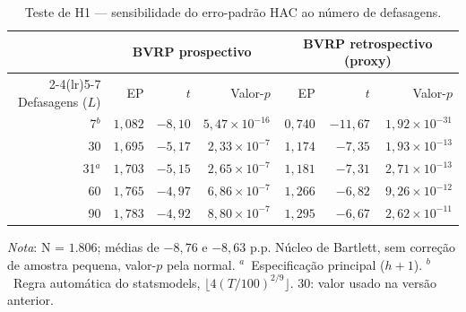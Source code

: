 \begin{table}[H]
\centering
\small
\caption{Teste de H1 --- sensibilidade do erro-padrão HAC ao número de defasagens.}
\label{tab:h1-sensibilidade-defasagens}
\begin{tabular}{rrrrrrr}
\toprule
 & \multicolumn{3}{c}{BVRP prospectivo} & \multicolumn{3}{c}{BVRP retrospectivo (proxy)} \\
\cmidrule(lr){2-4}\cmidrule(lr){5-7}
Defasagens ($L$) & EP & $t$ & Valor-$p$ & EP & $t$ & Valor-$p$ \\
\midrule
7$^{b}$ & $1{,}082$ & $-8{,}10$ & $5{,}47 \times 10^{-16}$ & $0{,}740$ & $-11{,}67$ & $1{,}92 \times 10^{-31}$ \\
30 & $1{,}695$ & $-5{,}17$ & $2{,}33 \times 10^{-7}$ & $1{,}174$ & $-7{,}35$ & $1{,}93 \times 10^{-13}$ \\
31$^{a}$ & $1{,}703$ & $-5{,}15$ & $2{,}65 \times 10^{-7}$ & $1{,}181$ & $-7{,}31$ & $2{,}71 \times 10^{-13}$ \\
60 & $1{,}765$ & $-4{,}97$ & $6{,}86 \times 10^{-7}$ & $1{,}266$ & $-6{,}82$ & $9{,}26 \times 10^{-12}$ \\
90 & $1{,}783$ & $-4{,}92$ & $8{,}80 \times 10^{-7}$ & $1{,}295$ & $-6{,}67$ & $2{,}62 \times 10^{-11}$ \\
\bottomrule
\end{tabular}
\par\smallskip
\footnotesize\textit{Nota}: N = $1{.}806$; médias de $-8{,}76$ e $-8{,}63$ p.p. Núcleo de Bartlett, sem correção de amostra pequena, valor-$p$ pela normal. $^{a}$~Especificação principal ($h+1$). $^{b}$~Regra automática do statsmodels, $\lfloor 4(T/100)^{2/9} \rfloor$. 30: valor usado na versão anterior.
\end{table}
